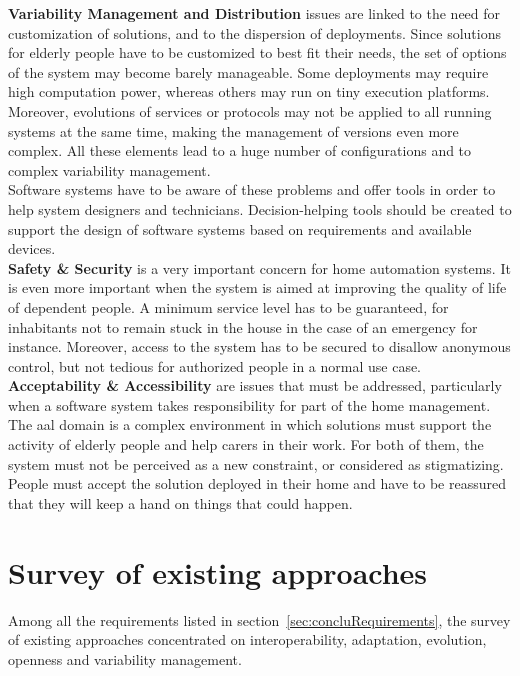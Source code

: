 {\bf Variability Management and Distribution} issues are linked to the need for customization of solutions, and to the dispersion of deployments. Since solutions for elderly people have to be customized to best fit their needs, the set of options of the system may become barely manageable. Some deployments may require high computation power, whereas others may run on tiny execution platforms. Moreover, evolutions of services or protocols may not be applied to all running systems at the same time, making the management of versions even more complex. All these elements lead to a huge number of configurations and to complex variability management.\\
Software systems have to be aware of these problems and offer tools in order to help system designers and technicians. Decision-helping tools should be created to support the design of software systems based on requirements and available devices.\\

{\bf Safety \& Security} is a very important concern for home automation systems. It is even more important when the system is aimed at improving the quality of life of dependent people. A minimum service level has to be guaranteed, for inhabitants not to remain stuck in the house in the case of an emergency for instance. Moreover, access to the system has to be secured to disallow anonymous control, but not tedious for authorized people in a normal use case.\\

{\bf Acceptability \& Accessibility} are issues that must be addressed, particularly when a software system takes responsibility for part of the home management. The \gls{aal} domain is a complex environment in which solutions must support the activity of elderly people and help carers in their work. For both of them, the system must not be perceived as a new constraint, or considered as stigmatizing. People must accept the solution deployed in their home and have to be reassured that they will keep a hand on things that could happen.\\


\section{Survey of existing approaches}

Among all the requirements listed in section~\ref{sec:concluRequirements}, the survey of existing approaches concentrated on interoperability, adaptation, evolution, openness and variability management.\\

